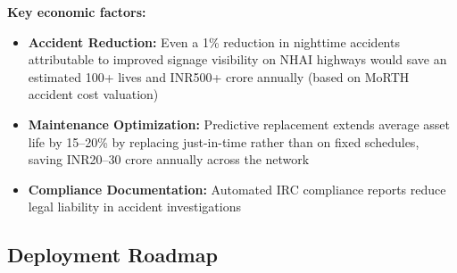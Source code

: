 \documentclass[11pt,a4paper]{article}
\newcommand{\rupmark}{\textrm{INR}}
\begin{document}
\textbf{Key economic factors:}
\begin{itemize}[noitemsep]
    \item \textbf{Accident Reduction:} Even a 1\% reduction in nighttime accidents attributable to improved signage visibility on NHAI highways would save an estimated 100+ lives and \rupmark500+ crore annually (based on MoRTH accident cost valuation)
    \item \textbf{Maintenance Optimization:} Predictive replacement extends average asset life by 15--20\% by replacing just-in-time rather than on fixed schedules, saving \rupmark20--30 crore annually across the network
    \item \textbf{Compliance Documentation:} Automated IRC compliance reports reduce legal liability in accident investigations
\end{itemize}

\subsection{Deployment Roadmap}
\end{document}
